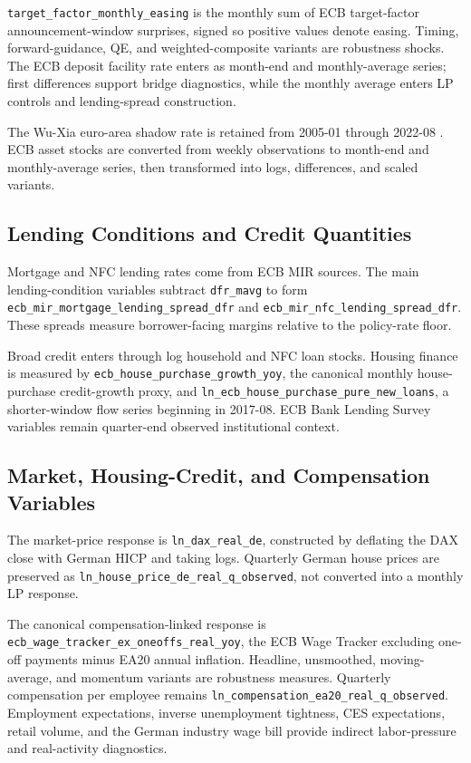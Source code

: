 \nolinkurl{target_factor_monthly_easing} is the monthly sum of ECB target-factor announcement-window surprises, signed so positive values denote easing. Timing, forward-guidance, QE, and weighted-composite variants are robustness shocks. The ECB deposit facility rate enters as month-end and monthly-average series; first differences support bridge diagnostics, while the monthly average enters LP controls and lending-spread construction.

The Wu-Xia euro-area shadow rate is retained from 2005-01 through 2022-08 \parencite{WuXia2016}. ECB asset stocks are converted from weekly observations to month-end and monthly-average series, then transformed into logs, differences, and scaled variants.

\subsection{Lending Conditions and Credit Quantities}

Mortgage and NFC lending rates come from ECB MIR sources. The main lending-condition variables subtract \nolinkurl{dfr_mavg} to form \nolinkurl{ecb_mir_mortgage_lending_spread_dfr} and \nolinkurl{ecb_mir_nfc_lending_spread_dfr}. These spreads measure borrower-facing margins relative to the policy-rate floor.

Broad credit enters through log household and NFC loan stocks. Housing finance is measured by \nolinkurl{ecb_house_purchase_growth_yoy}, the canonical monthly house-purchase credit-growth proxy, and \nolinkurl{ln_ecb_house_purchase_pure_new_loans}, a shorter-window flow series beginning in 2017-08. ECB Bank Lending Survey variables remain quarter-end observed institutional context.

\subsection{Market, Housing-Credit, and Compensation Variables}

The market-price response is \nolinkurl{ln_dax_real_de}, constructed by deflating the DAX close with German HICP and taking logs. Quarterly German house prices are preserved as \nolinkurl{ln_house_price_de_real_q_observed}, not converted into a monthly LP response.

The canonical compensation-linked response is \nolinkurl{ecb_wage_tracker_ex_oneoffs_real_yoy}, the ECB Wage Tracker excluding one-off payments minus EA20 annual inflation. Headline, unsmoothed, moving-average, and momentum variants are robustness measures. Quarterly compensation per employee remains \nolinkurl{ln_compensation_ea20_real_q_observed}. Employment expectations, inverse unemployment tightness, CES expectations, retail volume, and the German industry wage bill provide indirect labor-pressure and real-activity diagnostics.

